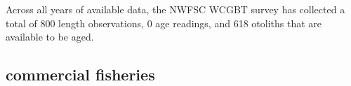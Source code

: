 \documentclass[11pt,
  english,
  letterpaper,
]{article}
\begin{document}
\leavevmode\tagmcend\tagstructend\par


Across all years of available data, the NWFSC WCGBT survey has collected a total of 800 length observations, 0 age readings, and 618 otoliths that are available to be aged.

\leavevmode\tagmcend\tagstructend\par


\hypertarget{commercial-fisheries-26}{%
\subsection{commercial fisheries}\label{commercial-fisheries-26}}

\leavevmode\tagmcend\tagstructend


\begingroup\fontsize{10}{12}\selectfont \begingroup\fontsize{10}{12}\selectfont

\leavevmode\tagmcend\tagstructend\par
\end{document}
